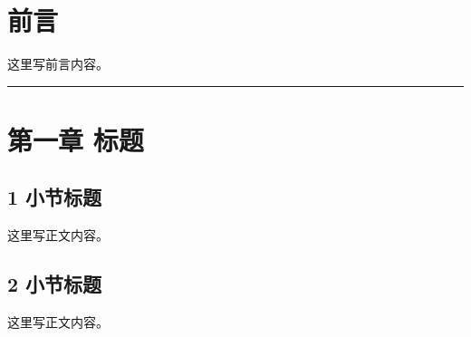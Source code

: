 \documentclass[oneside]{ctexbook}
\title{\BookTitle}
\author{\BookAuthor}
\date{}
\begin{document}
\frontmatter
{
\setcounter{tocdepth}{0}
\tableofcontents
}
\mainmatter

\chapter*{前言}
这里写前言内容。

\begin{center}\rule{0.5\linewidth}{0.5pt}\end{center}

\chapter{第一章 标题}
\section{1 小节标题}
这里写正文内容。

\section{2 小节标题}
这里写正文内容。

\backmatter
\end{document}
